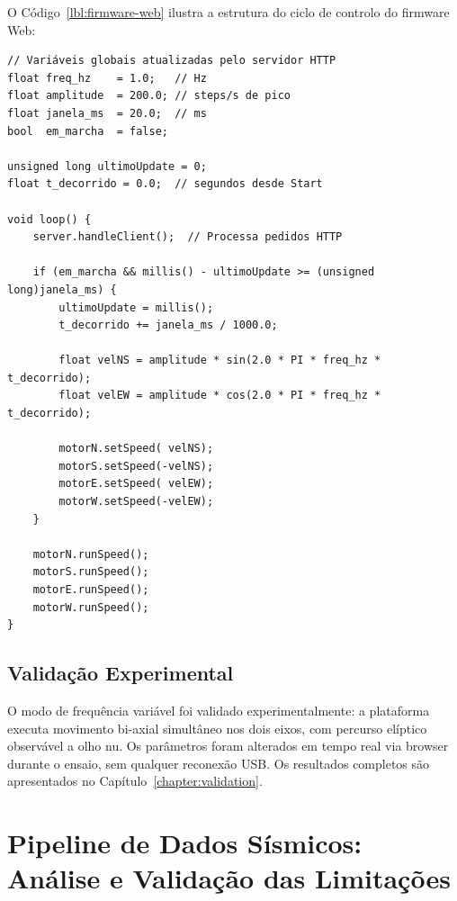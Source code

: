 O Código~\ref{lbl:firmware-web} ilustra a estrutura do ciclo de controlo do firmware Web:

\begin{listing}[h]
\begin{verbatim}
// Variáveis globais atualizadas pelo servidor HTTP
float freq_hz    = 1.0;   // Hz
float amplitude  = 200.0; // steps/s de pico
float janela_ms  = 20.0;  // ms
bool  em_marcha  = false;

unsigned long ultimoUpdate = 0;
float t_decorrido = 0.0;  // segundos desde Start

void loop() {
    server.handleClient();  // Processa pedidos HTTP

    if (em_marcha && millis() - ultimoUpdate >= (unsigned long)janela_ms) {
        ultimoUpdate = millis();
        t_decorrido += janela_ms / 1000.0;

        float velNS = amplitude * sin(2.0 * PI * freq_hz * t_decorrido);
        float velEW = amplitude * cos(2.0 * PI * freq_hz * t_decorrido);

        motorN.setSpeed( velNS);
        motorS.setSpeed(-velNS);
        motorE.setSpeed( velEW);
        motorW.setSpeed(-velEW);
    }

    motorN.runSpeed();
    motorS.runSpeed();
    motorE.runSpeed();
    motorW.runSpeed();
}
\end{verbatim}
\caption{Ciclo de controlo do firmware Web: movimento sinusoidal bi-axial com parâmetros configuráveis.}
\label{lbl:firmware-web}
\end{listing}


\subsection{Validação Experimental}
\label{subsec:validacao-web}

O modo de frequência variável foi validado experimentalmente: a plataforma executa movimento bi-axial simultâneo nos dois eixos, com percurso elíptico observável a olho nu. Os parâmetros foram alterados em tempo real via browser durante o ensaio, sem qualquer reconexão USB. Os resultados completos são apresentados no Capítulo~\ref{chapter:validation}.



\section{Pipeline de Dados Sísmicos: Análise e Validação das Limitações}
\label{sec:pipeline-dados}

